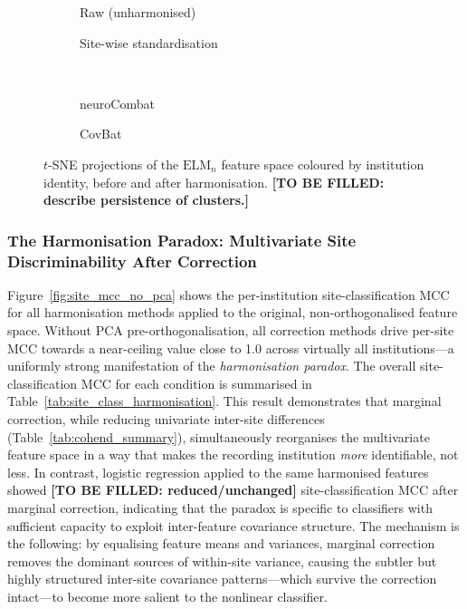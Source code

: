 \documentclass[preprint,12pt]{elsarticle}
\begin{document}
\begin{figure}[htbp]
  \centering
  \begin{subfigure}[t]{0.48\textwidth}
    \centering
    \caption{Raw (unharmonised)}
  \end{subfigure}
  \hfill
  \begin{subfigure}[t]{0.48\textwidth}
    \centering
    \caption{Site-wise standardisation}
  \end{subfigure}
  \\[6pt]
  \begin{subfigure}[t]{0.48\textwidth}
    \centering
    \caption{neuroCombat}
  \end{subfigure}
  \hfill
  \begin{subfigure}[t]{0.48\textwidth}
    \centering
    \caption{CovBat}
  \end{subfigure}
  \caption{$t$-SNE projections of the $\mathrm{ELM}_n$ feature space
    coloured by institution identity, before and after harmonisation.
    \textbf{[TO BE FILLED: describe persistence of clusters.]}}
  \label{fig:tsne}
\end{figure}

\subsubsection{The Harmonisation Paradox: Multivariate Site
Discriminability After Correction}
\label{subsubsec:paradox}

Figure~\ref{fig:site_mcc_no_pca} shows the per-institution
site-classification MCC for all harmonisation methods applied to the
original, non-orthogonalised feature space.
Without PCA pre-orthogonalisation, all correction methods drive
per-site MCC towards a near-ceiling value close to 1.0 across
virtually all institutions---a uniformly strong manifestation of the
\emph{harmonisation paradox}.
The overall site-classification MCC for each condition is summarised
in Table~\ref{tab:site_class_harmonisation}.
This result demonstrates that marginal correction, while reducing
univariate inter-site differences (Table~\ref{tab:cohend_summary}),
simultaneously reorganises the multivariate feature space in a way
that makes the recording institution \emph{more} identifiable, not
less.
In contrast, logistic regression applied to the same harmonised
features showed \textbf{[TO BE FILLED: reduced/unchanged]}
site-classification MCC after marginal correction, indicating that
the paradox is specific to classifiers with sufficient capacity to
exploit inter-feature covariance structure.
The mechanism is the following: by equalising feature means and
variances, marginal correction removes the dominant sources of
within-site variance, causing the subtler but highly structured
inter-site covariance patterns---which survive the correction
intact---to become more salient to the nonlinear classifier.
\end{document}
